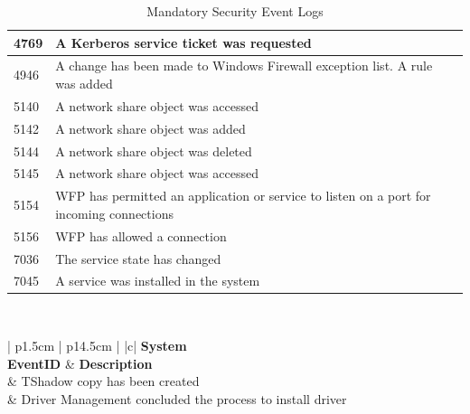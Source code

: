 \begin{table}[H]
\begin{tabular}{| p{1.5cm} | p{14.5cm} |}
        4769 & A Kerberos service ticket was requested \\ \hline
        4946 & A change has been made to Windows Firewall exception list. A rule was added \\ \hline
        5140 & A network share object was accessed \\ \hline
        5142 & A network share object was added \\ \hline
        5144 & A network share object was deleted \\ \hline
        5145 & A network share object was accessed \\ \hline
        5154 & WFP has permitted an application or service to listen on a port for incoming connections \\ \hline
        5156 & WFP has allowed a connection \\ \hline
        7036\footnotemark[1] & The service state has changed \\ \hline
        7045\footnotemark[1] & A service was installed in the system \\ \hline
    \end{tabular}
    \caption{Mandatory Security Event Logs}
\end{table}

\clearpage
\
\vspace{0.5cm}
\begin{table}[H]
    \centering
    \begin{tabular}{| p{1.5cm} | p{14.5cm} |} \hline
         {|c|} {\tiny\bfseries System} \\ \hline
        \textbf{EventID} & \textbf{Description}  \\ \footnotemark[1] & TShadow copy has been created \\ \hline
        20001\footnotemark[1] & Driver Management concluded the process to install driver  \\ \hline
    \end{tabular}
    \caption{Mandatory System Event Logs}
\end{table}

